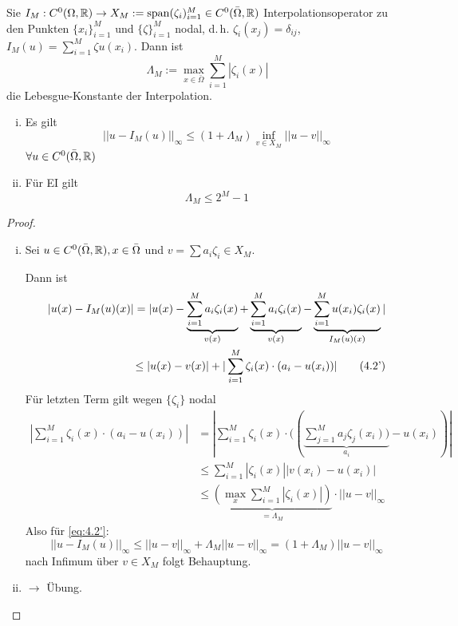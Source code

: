 \begin{satz}
Sie  $I_M:C^0(\Omega,\mathbb{R}) \rightarrow X_M := \operatorname{span} (\zeta_i)_{i=1}^M \in C^0(\bar{\Omega},\mathbb{R})$ Interpolationsoperator zu den Punkten $\{x_i\}_{i=1}^M$ und $\{\zeta\}_{i=1}^M$ nodal, d.\,h. $\zeta_i(x_j) = \delta_{ij}$, $I_M (u) = \sum\limits_{i=1}^M \zeta u(x_i)$. Dann ist
\[
	\Lambda_M := \max\limits_{x \in \bar{\Omega}} \sum\limits_{i=1}^M |\zeta_i (x)|
\]
die Lebesgue-Konstante der Interpolation.
\begin{enumerate}[i)]
	\item Es gilt
	\[
		|| u - I_M(u)||_{\infty} \leq (1 + \Lambda_M) \inf\limits_{v \in X_M} ||u-v||_{\infty}
	\]
	$\forall u \in C^0(\bar{\Omega},\mathbb{R})$
	\item Für EI gilt
	\[
		\Lambda_M \leq 2^M -1
	\]
\end{enumerate}
\begin{proof}
\begin{enumerate}[i)]
	\item Sei $u \in C^0 (\bar{\Omega},\mathbb{R}), x \in \bar{\Omega}$ und $v = \sum a_i \zeta_i \in X_M$.
	
	Dann ist
\begin{align}	
	|u(x) - I_M(u)(x)| = |u(x) - \underbrace{\sum\limits_{i=1}^M a_i \zeta_i(x)}_{v(x)} + \underbrace{\sum\limits_{i=1}^M a_i \zeta_i(x)}_{v(x)} - \underbrace{\sum\limits_{i=1}^M u(x_i) \zeta_i(x)}_{I_M(u)(x)}| \notag \\ \leq |u(x) - v(x)| + |\sum\limits_{i=1}^M \zeta_i(x) \cdot (a_i - u(x_i))| \tag{4.2'} \label{eq:4.2'}
	\end{align}
	Für letzten Term gilt wegen $\{\zeta_i\}$ nodal
	\begin{align*}
	|\sum\limits_{i=1}^M \zeta_i(x) \cdot (a_i - u(x_i))| &= |\sum\limits_{i=1}^M \zeta_i(x) \cdot ((\underbrace{\sum\limits_{j=1}^M a_j \zeta_j(x_i))}_{a_i} - u(x_i))| \\
	&\leq \sum\limits_{i=1}^M |\zeta_i(x)| |v(x_i) - u(x_i)| \\
	&\leq \underbrace{(\max\limits_x \sum\limits_{i=1}^M |\zeta_i(x)|)}_{= \Lambda_M} \cdot ||u-v||_{\infty}
	\end{align*}
	Also für \eqref{eq:4.2'}:
	\[
		||u-I_M(u)||_{\infty} \leq ||u-v||_{\infty} + \Lambda_M ||u-v||_{\infty} = (1 + \Lambda_M) ||u-v||_{\infty}
	\]
	nach Infimum über $v \in X_M$ folgt Behauptung.
	\item $\rightarrow$ Übung.
\end{enumerate}
\end{proof}
\end{satz}

